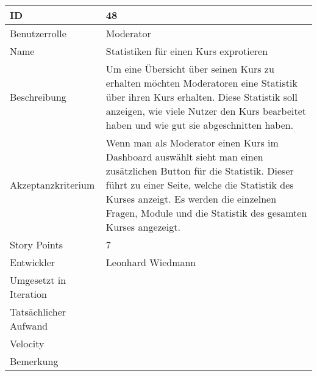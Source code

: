 \begin{tabularx}{\textwidth}{|p{}|X|}
	\hline
	ID & 48\\
	\hline
	Benutzerrolle & Moderator\\
	\hline
	Name & Statistiken für einen Kurs exprotieren\\
	\hline
	Beschreibung & Um eine Übersicht über seinen Kurs zu erhalten möchten Moderatoren eine Statistik über ihren Kurs erhalten. Diese Statistik soll anzeigen, wie viele Nutzer den Kurs bearbeitet haben und wie gut sie abgeschnitten haben.\\
	\hline
	Akzeptanzkriterium & Wenn man als Moderator einen Kurs im Dashboard auswählt sieht man einen zusätzlichen Button für die Statistik. Dieser führt zu einer Seite, welche die Statistik des Kurses anzeigt. Es werden die einzelnen Fragen, Module und die Statistik des gesamten Kurses angezeigt.\\
	\hline
	Story Points & 7\\
	\hline
	Entwickler & Leonhard Wiedmann\\
	\hline
	Umgesetzt in Iteration & \\
	\hline
	Tatsächlicher Aufwand & \\
	\hline
	Velocity & \\
	\hline
	Bemerkung & \\
	\hline
\end{tabularx}
\vspace{20pt}
